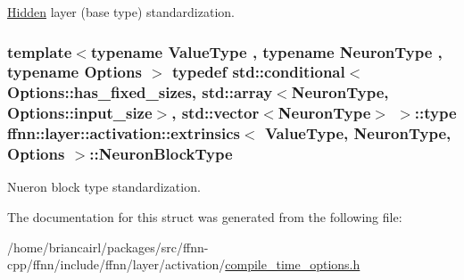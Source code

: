 \hyperlink{classffnn_1_1layer_1_1_hidden}{Hidden} layer (base type) standardization. 

\hypertarget{structffnn_1_1layer_1_1activation_1_1extrinsics_a3bd0eb92b3368bfef1fead81906baa89}{
\subsubsection[{Neuron\-Block\-Type}]{\setlength{\rightskip}{0pt plus 5cm}template$<$typename Value\-Type , typename Neuron\-Type , typename Options $>$ typedef std\-::conditional$<$ Options\-::has\-\_\-fixed\-\_\-sizes, std\-::array$<$Neuron\-Type, Options\-::input\-\_\-size$>$, std\-::vector$<$Neuron\-Type$>$ $>$\-::type {\bf ffnn\-::layer\-::activation\-::extrinsics}$<$ Value\-Type, Neuron\-Type, Options $>$\-::{\bf Neuron\-Block\-Type}}}\label{structffnn_1_1layer_1_1activation_1_1extrinsics_a3bd0eb92b3368bfef1fead81906baa89}


Nueron block type standardization. 



The documentation for this struct was generated from the following file\-:\begin{DoxyCompactItemize}
\item 
/home/briancairl/packages/src/ffnn-\/cpp/ffnn/include/ffnn/layer/activation/\hyperlink{activation_2compile__time__options_8h}{compile\-\_\-time\-\_\-options.\-h}\end{DoxyCompactItemize}
